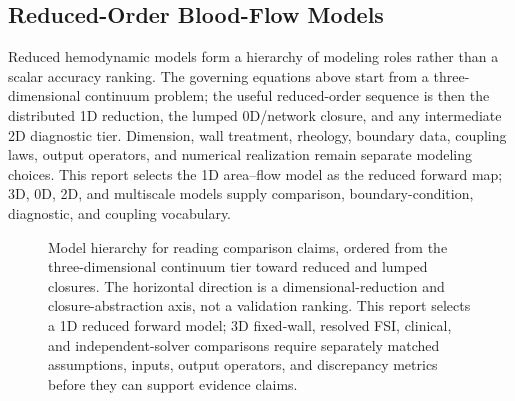\subsection{Reduced-Order Blood-Flow Models}
\label{subsec:model-hierarchy-comparison-boundary}

Reduced hemodynamic models form a hierarchy of modeling roles rather than a
scalar accuracy ranking. The governing equations above start from a
three-dimensional continuum problem; the useful reduced-order sequence is then
the distributed 1D reduction, the lumped 0D/network closure, and any
intermediate 2D diagnostic tier. Dimension, wall treatment, rheology, boundary
data, coupling laws, output operators, and numerical realization remain
separate modeling choices. This report selects the 1D area--flow model as the
reduced forward map; 3D, 0D, 2D, and multiscale models supply comparison,
boundary-condition, diagnostic, and coupling vocabulary.

\begin{figure}[!htb]
    \centering
    \captionsetup{aboveskip=2pt,belowskip=2pt}
    \caption{Model hierarchy for reading comparison claims, ordered from the
    three-dimensional continuum tier toward reduced and lumped closures. The
    horizontal direction is a dimensional-reduction and closure-abstraction
    axis, not a validation ranking. This report selects a 1D reduced forward
    model; 3D fixed-wall, resolved FSI, clinical, and independent-solver
    comparisons require separately matched assumptions, inputs, output
    operators, and discrepancy metrics before they can support evidence claims.}
    \label{fig:model-hierarchy-overview}
\end{figure}

